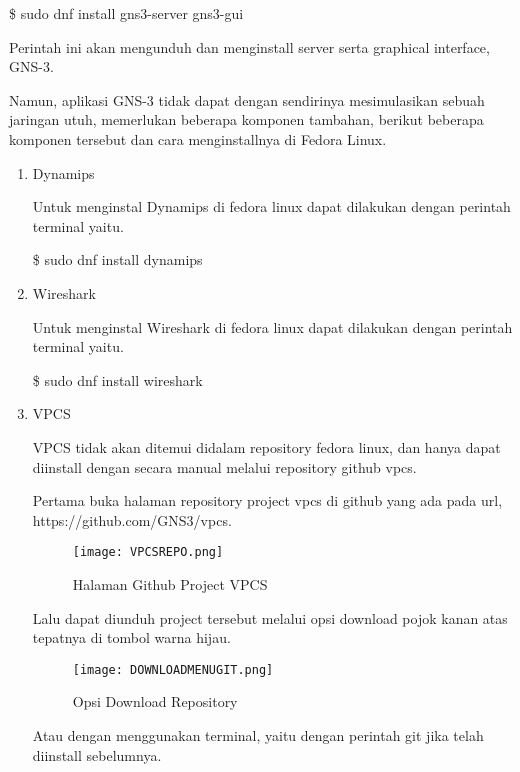 \documentclass[12pt, a4paper]{article}
\begin{document}
      \$ sudo dnf install gns3-server gns3-gui

      Perintah ini akan mengunduh dan menginstall server serta graphical interface,
      GNS-3.
    
      Namun, aplikasi GNS-3 tidak dapat dengan sendirinya mesimulasikan
      sebuah jaringan utuh, memerlukan beberapa komponen tambahan,
      berikut beberapa komponen tersebut dan cara menginstallnya
      di Fedora Linux.

      \begin{enumerate}[label=\arabic*.]
        \item Dynamips

          Untuk menginstal Dynamips di fedora linux dapat dilakukan dengan
          perintah terminal yaitu.

          \$ sudo dnf install dynamips

        \item Wireshark

          Untuk menginstal Wireshark di fedora linux dapat dilakukan dengan
          perintah terminal yaitu.

          \$ sudo dnf install wireshark

        \item VPCS

          VPCS tidak akan ditemui didalam repository fedora linux, dan hanya
          dapat diinstall dengan secara manual melalui repository github
          vpcs.

          Pertama buka halaman repository project vpcs di github yang ada
          pada url, https://github.com/GNS3/vpcs.

          \begin{figure}[h]
              \centering
              \texttt{[image: VPCSREPO.png]}
              \caption{\small{Halaman Github Project VPCS}}
          \end{figure}

          Lalu dapat diunduh project tersebut melalui opsi download pojok
          kanan atas tepatnya di tombol warna hijau.

          \begin{figure}[h]
              \centering
              \texttt{[image: DOWNLOADMENUGIT.png]}
              \caption{\small{Opsi Download Repository}}
          \end{figure}

          Atau dengan menggunakan terminal, yaitu dengan perintah git jika telah
          diinstall sebelumnya.


\end{enumerate}
\end{document}
